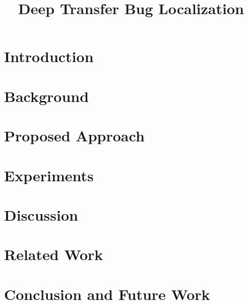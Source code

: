 \documentclass[sigconf]{acmart}
\begin{document}
\title{Deep Transfer Bug Localization}

\begin{abstract}
\end{abstract}

\maketitle

\section{Introduction}\label{sec.intro}


\section{Background}\label{sec.background}


\section{Proposed Approach}\label{sec.approach}


\section{Experiments}\label{sec.exp}


\section{Discussion}\label{sec.discuss}


\section{Related Work}\label{sec.related}


\section{Conclusion and Future Work}\label{sec.conclusion}




\end{document}
